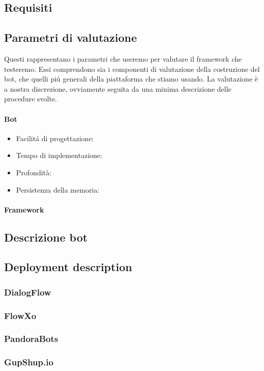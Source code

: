 \documentclass[]{article}
\begin{document}
\subsection{Requisiti}
\subsection{Parametri di valutazione}
Questi rappresentano i parametri che useremo per valutare il framework che testeremo. Essi comprendono sia i componenti di valutazione della costruzione del bot, che quelli piú generali della piattaforma che stiamo usando. La valutazione è a nostra discrezione, ovviamente seguita da una minima descrizione delle procedure svolte.

\paragraph{Bot}
\begin{itemize}
\item{Facilitá di progettazione:} 
\item{Tempo di implementazione:} 
\item{Profondità:} 
\item{Persistenza della memoria:} 
\end{itemize}

\paragraph{Framework}
\subsection{Descrizione bot}
\subsection{Deployment description}
\subsubsection{DialogFlow}
\subsubsection{FlowXo}
\subsubsection{PandoraBots}
\subsubsection{GupShup.io}
\end{document}
